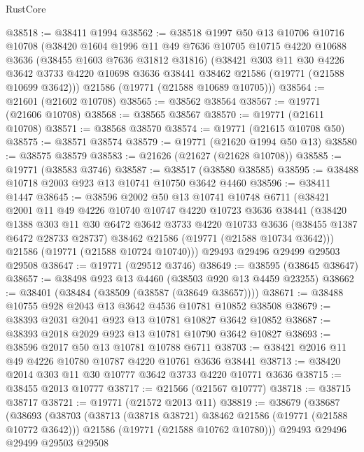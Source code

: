 \begin{lexlean}{RustCore}
\begin{coremodule}
@38518 := @38411 @1994
@38562 := @38518
    @1997
    @50
    @13
    @10706
    @10716
    @10708
    (@38420
      @1604
      @1996
      @11
      @49
      @7636
      @10705
      @10715
      @4220
      @10688
      @3636
      (@38455 @1603 @7636 @31812 @31816)
      (@38421
        @303
        @11
        @30
        @4226
        @3642
        @3733
        @4220
        @10698
        @3636
        @38441
        @38462
        @21586
        (@19771 (@21588 @10699 @3642)))
      @21586
      (@19771 (@21588 @10689 @10705)))
@38564 := @21601 (@21602 @10708)
@38565 := @38562 @38564
@38567 := @19771 (@21606 @10708)
@38568 := @38565 @38567
@38570 := @19771 (@21611 @10708)
@38571 := @38568 @38570
@38574 := @19771 (@21615 @10708 @50)
@38575 := @38571 @38574
@38579 := @19771 (@21620 @1994 @50 @13)
@38580 := @38575 @38579
@38583 := @21626 (@21627 (@21628 @10708))
@38585 := @19771 (@38583 @3746)
@38587 := @38517 (@38580 @38585)
@38595 := @38488 @10718 @2003 @923 @13 @10741 @10750 @3642 @4460
@38596 := @38411 @1447
@38645 := @38596
    @2002
    @50
    @13
    @10741
    @10748
    @6711
    (@38421
      @2001
      @11
      @49
      @4226
      @10740
      @10747
      @4220
      @10723
      @3636
      @38441
      (@38420
        @1388
        @303
        @11
        @30
        @6472
        @3642
        @3733
        @4220
        @10733
        @3636
        (@38455 @1387 @6472 @28733 @28737)
        @38462
        @21586
        (@19771 (@21588 @10734 @3642)))
      @21586
      (@19771 (@21588 @10724 @10740)))
    @29493
    @29496
    @29499
    @29503
    @29508
@38647 := @19771 (@29512 @3746)
@38649 := @38595 (@38645 @38647)
@38657 := @38498 @923 @13 @4460 (@38503 @920 @13 @4459 @23255)
@38662 := @38401 (@38484 (@38509 (@38587 (@38649 @38657))))
@38671 := @38488 @10755 @928 @2043 @13 @3642 @4536 @10781 @10852 @38508
@38679 := @38393 @2031 @2041 @923 @13 @10781 @10827 @3642 @10852
@38687 := @38393 @2018 @2029 @923 @13 @10781 @10790 @3642 @10827
@38693 := @38596 @2017 @50 @13 @10781 @10788 @6711
@38703 := @38421 @2016 @11 @49 @4226 @10780 @10787 @4220 @10761 @3636 @38441
@38713 := @38420 @2014 @303 @11 @30 @10777 @3642 @3733 @4220 @10771 @3636
@38715 := @38455 @2013 @10777
@38717 := @21566 (@21567 @10777)
@38718 := @38715 @38717
@38721 := @19771 (@21572 @2013 @11)
@38819 := @38679
    (@38687
      (@38693
        (@38703
          (@38713 (@38718 @38721) @38462 @21586 (@19771 (@21588 @10772 @3642)))
          @21586
          (@19771 (@21588 @10762 @10780)))
        @29493
        @29496
        @29499
        @29503
        @29508

\end{coremodule}
\end{lexlean}
